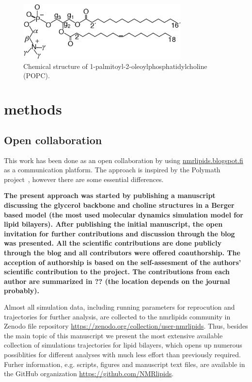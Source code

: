 \documentclass[pre,aps,floatfix,authordate1-4,twocolumn]{revtex4-1}
\begin{document}
  \begin{figure}[]
  \centering
  \includegraphics[width=8.6cm]{POPCstructure.eps}

  \caption{\label{POPCstructure}
    Chemical structure of  1-palmitoyl-2-oleoylphosphatidylcholine (POPC).}
  
\end{figure}

\section{methods}

\subsection{Open collaboration}

This work has been done as an open collaboration by using \url{nmrlipids.blogspot.fi} as a communication platform.
The approach is inspired by the Polymath project~\cite{gowers09}, however there are some essential differences. 
{\bf The present approach was started by publishing a manuscript~\cite{ollila13} discussing the glycerol backbone and choline structures 
in a Berger based model (the most used molecular dynamics simulation model for lipid bilayers).
After publishing the initial manuscript, the open invitation for further contributions and discussion through the blog was presented.
All the scientific contributions are done publicly through the blog and all contributors were offered coauthorship. 
The acception of authorship is based on the self-assesment of the authors' scientific contribution to the project.
The contributions from each author are summarized in ?? (the location depends on the journal probably).

Almost all simulation data, including running parameters for reprocution and trajectories for further analysis, are collected
to the nmrlipids community in Zenodo file repository \url{https://zenodo.org/collection/user-nmrlipids}.
Thus, besides the main topic of this manuscript we present the most extensive available collection of simulations trajectories
for lipid bilayers, which opens up numerous possiblities for different analyses with much less effort than previously required.
Furher information, e.g. scripts, figures and manuscript text files, are available in the GitHub organization \url{https://github.com/NMRlipids}.
}
\end{document}
